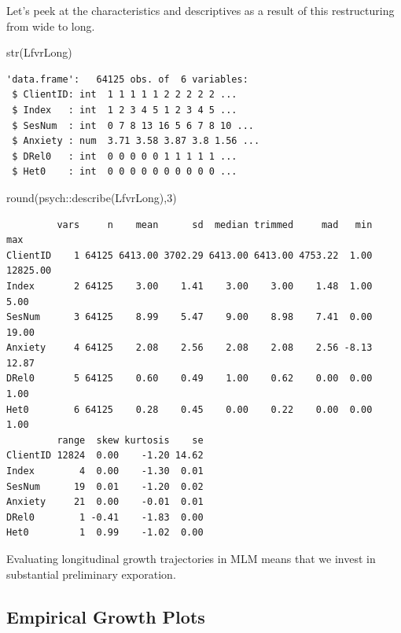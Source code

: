 \documentclass[
  english,
]{book}
\newenvironment{Shaded}{\begin{snugshade}}{\end{snugshade}}
\newcommand{\DecValTok}[1]{\textcolor[rgb]{0.00,0.00,0.81}{#1}}
\newcommand{\FunctionTok}[1]{\textcolor[rgb]{0.00,0.00,0.00}{#1}}
\newcommand{\NormalTok}[1]{#1}
\newcommand{\SpecialCharTok}[1]{\textcolor[rgb]{0.00,0.00,0.00}{#1}}
\begin{document}
Let's peek at the characteristics and descriptives as a result of this restructuring from wide to long.

\begin{Shaded}
\begin{Highlighting}[]
\FunctionTok{str}\NormalTok{(LfvrLong)}
\end{Highlighting}
\end{Shaded}

\begin{verbatim}
'data.frame':   64125 obs. of  6 variables:
 $ ClientID: int  1 1 1 1 1 2 2 2 2 2 ...
 $ Index   : int  1 2 3 4 5 1 2 3 4 5 ...
 $ SesNum  : int  0 7 8 13 16 5 6 7 8 10 ...
 $ Anxiety : num  3.71 3.58 3.87 3.8 1.56 ...
 $ DRel0   : int  0 0 0 0 0 1 1 1 1 1 ...
 $ Het0    : int  0 0 0 0 0 0 0 0 0 0 ...
\end{verbatim}

\begin{Shaded}
\begin{Highlighting}[]
\FunctionTok{round}\NormalTok{(psych}\SpecialCharTok{::}\FunctionTok{describe}\NormalTok{(LfvrLong),}\DecValTok{3}\NormalTok{)}
\end{Highlighting}
\end{Shaded}

\begin{verbatim}
         vars     n    mean      sd  median trimmed     mad   min      max
ClientID    1 64125 6413.00 3702.29 6413.00 6413.00 4753.22  1.00 12825.00
Index       2 64125    3.00    1.41    3.00    3.00    1.48  1.00     5.00
SesNum      3 64125    8.99    5.47    9.00    8.98    7.41  0.00    19.00
Anxiety     4 64125    2.08    2.56    2.08    2.08    2.56 -8.13    12.87
DRel0       5 64125    0.60    0.49    1.00    0.62    0.00  0.00     1.00
Het0        6 64125    0.28    0.45    0.00    0.22    0.00  0.00     1.00
         range  skew kurtosis    se
ClientID 12824  0.00    -1.20 14.62
Index        4  0.00    -1.30  0.01
SesNum      19  0.01    -1.20  0.02
Anxiety     21  0.00    -0.01  0.01
DRel0        1 -0.41    -1.83  0.00
Het0         1  0.99    -1.02  0.00
\end{verbatim}

Evaluating longitudinal growth trajectories in MLM means that we invest in substantial preliminary exporation.

\hypertarget{empirical-growth-plots}{%
\subsection{Empirical Growth Plots}\label{empirical-growth-plots}}
\end{document}
